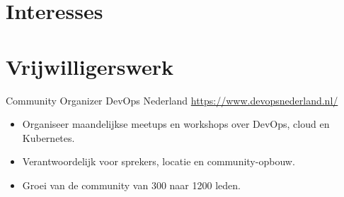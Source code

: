 \documentclass[a4paper, serif, 10pt]{moderncv}
\begin{document}
\section{Interesses}

\section{Vrijwilligerswerk}

        {Community Organizer}
        {DevOps Nederland}
        {\url{https://www.devopsnederland.nl/}}
        {}
        {\begin{itemize}
\item Organiseer maandelijkse meetups en workshops over DevOps, cloud en Kubernetes.
\item Verantwoordelijk voor sprekers, locatie en community-opbouw.
\item Groei van de community van 300 naar 1200 leden.
\end{itemize}}
    
\end{document}
